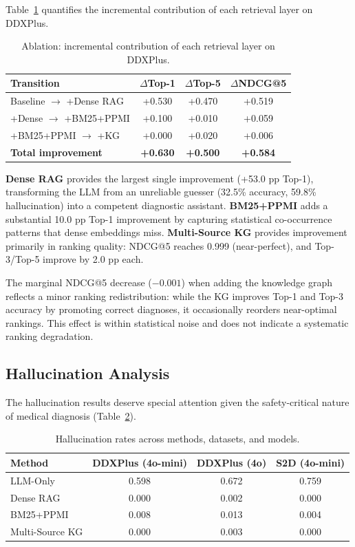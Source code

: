 \documentclass[preprint,12pt]{elsarticle}
\begin{document}
Table~\ref{tab:ablation} quantifies the incremental contribution of each retrieval layer on DDXPlus.

\begin{table}[t]
\centering
\caption{Ablation: incremental contribution of each retrieval layer on DDXPlus.}
\label{tab:ablation}
\begin{tabular}{lccc}
\toprule
\textbf{Transition} & \textbf{$\Delta$Top-1} & \textbf{$\Delta$Top-5} & \textbf{$\Delta$NDCG@5} \\
\midrule
Baseline $\to$ +Dense RAG    & +0.530 & +0.470 & +0.519 \\
+Dense $\to$ +BM25+PPMI      & +0.100 & +0.010 & +0.059 \\
+BM25+PPMI $\to$ +KG         & +0.000 & +0.020 & +0.006 \\
\midrule
\textbf{Total improvement}   & \textbf{+0.630} & \textbf{+0.500} & \textbf{+0.584} \\
\bottomrule
\end{tabular}
\end{table}

\textbf{Dense RAG} provides the largest single improvement (+53.0 pp Top-1), transforming the LLM from an unreliable guesser (32.5\% accuracy, 59.8\% hallucination) into a competent diagnostic assistant. \textbf{BM25+PPMI} adds a substantial 10.0 pp Top-1 improvement by capturing statistical co-occurrence patterns that dense embeddings miss. \textbf{Multi-Source KG} provides improvement primarily in ranking quality: NDCG@5 reaches 0.999 (near-perfect), and Top-3/Top-5 improve by 2.0 pp each.

The marginal NDCG@5 decrease ($-0.001$) when adding the knowledge graph reflects a minor ranking redistribution: while the KG improves Top-1 and Top-3 accuracy by promoting correct diagnoses, it occasionally reorders near-optimal rankings. This effect is within statistical noise and does not indicate a systematic ranking degradation.

\subsection{Hallucination Analysis}
\label{sec:hallucination}

The hallucination results deserve special attention given the safety-critical nature of medical diagnosis (Table~\ref{tab:halluc}).

\begin{table}[t]
\centering
\caption{Hallucination rates across methods, datasets, and models.}
\label{tab:halluc}
\begin{tabular}{lccc}
\toprule
\textbf{Method} & \textbf{DDXPlus (4o-mini)} & \textbf{DDXPlus (4o)} & \textbf{S2D (4o-mini)} \\
\midrule
LLM-Only        & 0.598 & 0.672 & 0.759 \\
Dense RAG        & 0.000 & 0.002 & 0.000 \\
BM25+PPMI        & 0.008 & 0.013 & 0.004 \\
Multi-Source KG  & 0.000 & 0.003 & 0.000 \\
\bottomrule
\end{tabular}
\end{table}
\end{document}
